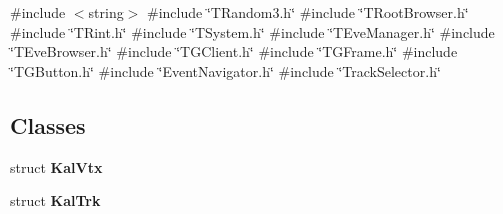 {\ttfamily \#include $<$string$>$}\newline
{\ttfamily \#include \char`\"{}T\+Random3.\+h\char`\"{}}\newline
{\ttfamily \#include \char`\"{}T\+Root\+Browser.\+h\char`\"{}}\newline
{\ttfamily \#include \char`\"{}T\+Rint.\+h\char`\"{}}\newline
{\ttfamily \#include \char`\"{}T\+System.\+h\char`\"{}}\newline
{\ttfamily \#include \char`\"{}T\+Eve\+Manager.\+h\char`\"{}}\newline
{\ttfamily \#include \char`\"{}T\+Eve\+Browser.\+h\char`\"{}}\newline
{\ttfamily \#include \char`\"{}T\+G\+Client.\+h\char`\"{}}\newline
{\ttfamily \#include \char`\"{}T\+G\+Frame.\+h\char`\"{}}\newline
{\ttfamily \#include \char`\"{}T\+G\+Button.\+h\char`\"{}}\newline
{\ttfamily \#include \char`\"{}Event\+Navigator.\+h\char`\"{}}\newline
{\ttfamily \#include \char`\"{}Track\+Selector.\+h\char`\"{}}\newline
\subsection*{Classes}
\begin{DoxyCompactItemize}
\item 
struct \textbf{ Kal\+Vtx}
\item 
struct \textbf{ Kal\+Trk}
\end{DoxyCompactItemize}
